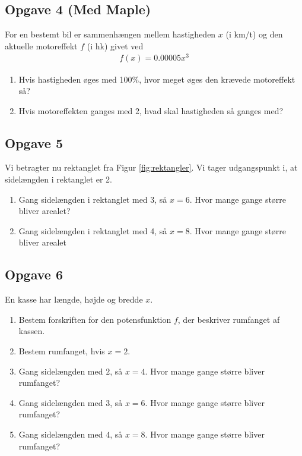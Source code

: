\subsection*{Opgave 4 (Med Maple)}
For en bestemt bil er sammenhængen mellem hastigheden $x$ (i km/t) og den aktuelle motoreffekt $f$ (i hk) givet ved
\begin{align*}
	f(x) = 0.00005x^3
\end{align*}
\begin{enumerate}[label=\roman*)]
	\item Hvis hastigheden øges med 100$\%$, hvor meget øges den krævede motoreffekt så?
	\item Hvis motoreffekten ganges med 2, hvad skal hastigheden så ganges med?
\end{enumerate}


\subsection*{Opgave 5}
Vi betragter nu rektanglet fra Figur \ref{fig:rektangler}. Vi tager udgangspunkt i, at sidelængden i rektanglet er 2.
\begin{enumerate}[label = \roman*)]
	\item Gang sidelængden i rektanglet med 3, så $x = 6$. Hvor mange gange større bliver arealet?
	\item Gang sidelængden i rektanglet med 4, så $x = 8$. Hvor mange gange større bliver arealet
\end{enumerate}

\subsection*{Opgave 6}
En kasse har længde, højde og bredde $x$. 
\begin{enumerate}[label=\roman*)]
	\item Bestem forskriften for den potensfunktion $f$, der beskriver rumfanget af kassen.
	\item Bestem rumfanget, hvis $x = 2$.
	\item Gang sidelængden med $2$, så $x = 4$. Hvor mange gange større bliver rumfanget?
	\item Gang sidelængden med $3$, så $x = 6$. Hvor mange gange større bliver rumfanget?
	\item Gang sidelængden med $4$, så $x = 8$. Hvor mange gange større bliver rumfanget?
\end{enumerate}



